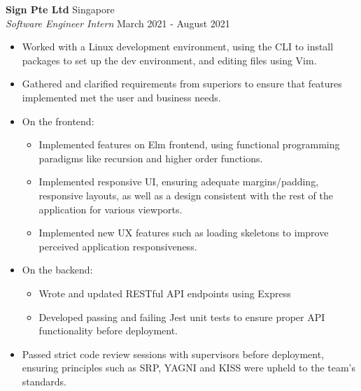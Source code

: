 \documentclass[a4paper]{article}
\begin{document}
\textbf{Sign Pte Ltd} \hfill Singapore\\
\textit{Software Engineer Intern} \hfill March 2021 - August 2021\\
\vspace{-1mm}
\begin{itemize} \itemsep 0.3pt
  \item Worked with a Linux development environment, using the CLI to install packages to set up the dev environment, and editing files using Vim.
	\item Gathered and clarified requirements from superiors to ensure that features implemented met the user and business needs.
	\item On the frontend:
  \vspace{-2mm}
  \begin{itemize} \itemsep 0.2pt
    \item Implemented features on Elm frontend, using functional programming paradigms like recursion and higher order functions.
    \item Implemented responsive UI, ensuring adequate margins/padding, responsive layouts, as well as a design consistent with the rest of the application for various viewports.
    \item Implemented new UX features such as loading skeletons to improve perceived application responsiveness.
  \end{itemize}
	\item On the backend:
  \vspace{-2mm}
  \begin{itemize} \itemsep 0.2pt
    \item Wrote and updated RESTful API endpoints using Express
    \item Developed passing and failing Jest unit tests to ensure proper API functionality before deployment.
  \end{itemize}
  \item Passed strict code review sessions with supervisors before deployment, ensuring principles such as SRP, YAGNI and KISS were upheld to the team's standards.
\end{itemize}
\end{document}
